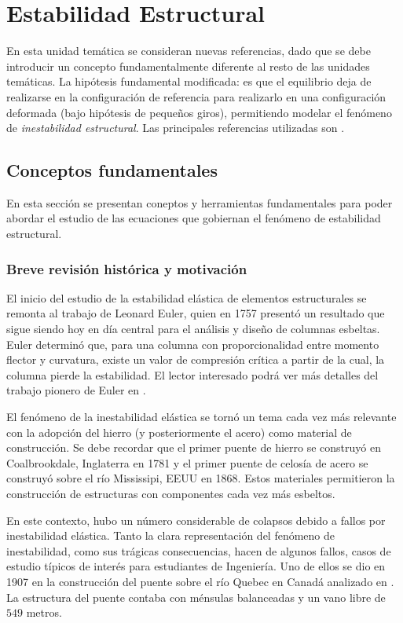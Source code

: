 \chapter{Estabilidad Estructural}

En esta unidad temática se consideran nuevas referencias, dado que se debe introducir un concepto fundamentalmente diferente al resto de las unidades temáticas. %
%
La hipótesis fundamental modificada: es que el equilibrio deja de realizarse en la configuración de referencia para realizarlo en una configuración deformada (bajo hipótesis de pequeños giros), permitiendo modelar el fenómeno de \textit{inestabilidad estructural}. %
%
Las principales referencias utilizadas son \citep{yoo2011,Bazzano2017}. 

\section{Conceptos fundamentales} 

En esta sección se presentan coneptos y herramientas fundamentales para poder abordar el estudio de las ecuaciones que gobiernan el fenómeno de estabilidad estructural.

\subsection{Breve revisión histórica y motivación}

El inicio del estudio de la estabilidad elástica de elementos estructurales se remonta al trabajo de Leonard Euler, quien en 1757 presentó un resultado que sigue siendo hoy en día central para el análisis y diseño de columnas esbeltas. %
%
Euler determinó que, para una columna con proporcionalidad entre momento flector y curvatura, existe un valor de compresión crítica a partir de la cual, la columna pierde la estabilidad. %
%
El lector interesado podrá ver más detalles del trabajo pionero de Euler en \citep{Timoshenko1953}.

El fenómeno de la inestabilidad elástica se tornó un tema cada vez más relevante con la adopción del hierro (y posteriormente el acero) como material de construcción. %
%
Se debe recordar que el primer puente de hierro se construyó en Coalbrookdale, Inglaterra en 1781 y el primer puente de celosía de acero se construyó sobre el río Mississipi, EEUU en 1868.  Estos materiales permitieron la construcción de estructuras con componentes cada vez más esbeltos. 

En este contexto, hubo un número considerable de colapsos debido a fallos por inestabilidad elástica. %
%
Tanto la clara representación del fenómeno de inestabilidad, como sus trágicas consecuencias, hacen de algunos fallos, casos de estudio típicos de interés para estudiantes de Ingeniería. %
%
Uno de ellos se dio en 1907 en la construcción del puente sobre el río Quebec en Canadá analizado en \citep{Brady}. %
%
La estructura del puente contaba con ménsulas balanceadas y un vano libre de $549$ metros. %

